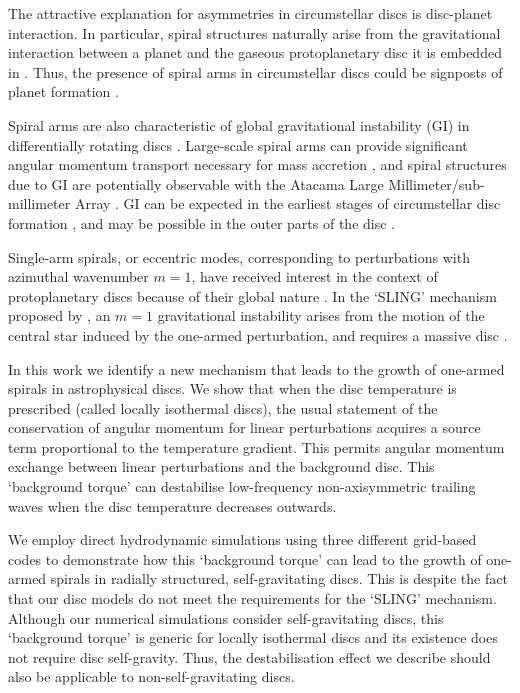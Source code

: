 \documentclass[useAMS,usenatbib]{mn2e}
\begin{document}
The attractive explanation for asymmetries in circumstellar discs is
disc-planet interaction. In particular, spiral structures  
naturally arise from the gravitational interaction between a
planet and the gaseous protoplanetary disc it is embedded in
\citep[see, e.g.][for a recent review]{baruteau13b}. Thus, the
presence of spiral arms in circumstellar discs could be signposts of 
planet formation \citep[but see][]{juhasz14}.

Spiral arms are also  characteristic of global gravitational 
instability (GI)  in differentially rotating discs
\citep{goldreich65,laughlin96b,laughlin98,nelson98,lodato05,forgan11}. Large-scale 
spiral arms can provide significant angular momentum transport
necessary for mass accretion \citep{lynden-bell72,
  papaloizou91,balbus99,lodato04}, and spiral structures due to GI are
potentially observable with the Atacama Large
Millimeter/sub-millimeter Array \citep{cossins10,dipierror14}. GI can
be expected in the earliest stages of circumstellar disc formation 
\citep{kratter10b,inutsuka10,tsukamoto13}, and may be possible in the
outer parts of the disc \citep{rafikov05,matzner05,kimura12}.  

Single-arm spirals, or eccentric modes, corresponding to perturbations 
with azimuthal wavenumber $m=1$, have received interest in 
the context of protoplanetary discs because of their global nature
\citep{adams89,heemskerk92,laughlin96,tremaine01,papaloizou02,hopkins10}. 
In the `SLING' mechanism proposed by \cite{shu90}, an $m=1$ 
  gravitational instability arises from the motion of the
central star induced by the one-armed perturbation, and requires a
massive disc \citep[the former may have observable consequences,
][]{michael10}.    


  In this work we identify a new mechanism that leads to the growth of
  one-armed spirals in astrophysical discs. We show
  that when the disc temperature is prescribed (called locally isothermal
  discs), the usual statement of the conservation of angular momentum
  for linear perturbations acquires a source term proportional to the
  temperature gradient. This permits angular momentum exchange between
  linear perturbations and the background disc. This `background
  torque' can destabilise low-frequency non-axisymmetric
  trailing waves when the disc temperature decreases outwards.       
  

 We employ direct hydrodynamic simulations using three different
  grid-based codes to demonstrate how this `background torque' 
  can lead to the growth of one-armed spirals in radially structured, 
  self-gravitating discs. This is despite the fact that our disc
  models do not meet the requirements for the `SLING' 
  mechanism. Although our numerical simulations consider
  self-gravitating discs, this `background torque' is generic for
  locally isothermal discs and its existence does not require
  disc self-gravity. Thus, the destabilisation effect we
  describe should also be applicable to non-self-gravitating discs.  
\end{document}

